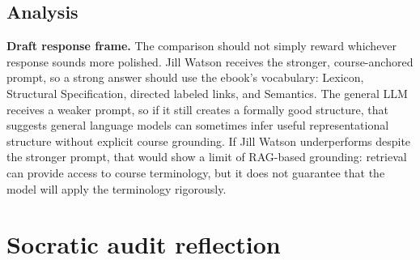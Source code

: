 \documentclass[
	letterpaper, %
]{jdf}
\begin{document}
\subsection{Analysis}

%

\textbf{Draft response frame.} The comparison should not simply reward whichever response sounds more polished. Jill Watson receives the stronger, course-anchored prompt, so a strong answer should use the ebook's vocabulary: Lexicon, Structural Specification, directed labeled links, and Semantics. The general LLM receives a weaker prompt, so if it still creates a formally good structure, that suggests general language models can sometimes infer useful representational structure without explicit course grounding. If Jill Watson underperforms despite the stronger prompt, that would show a limit of RAG-based grounding: retrieval can provide access to course terminology, but it does not guarantee that the model will apply the terminology rigorously.


\section{Socratic audit reflection}
\end{document}
